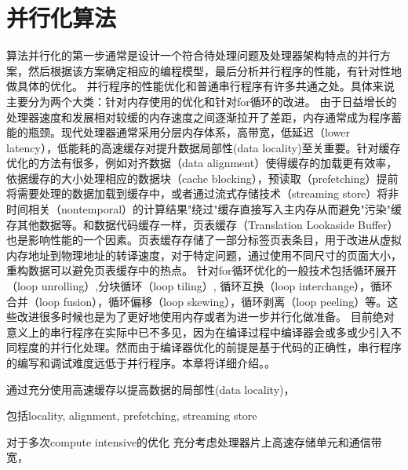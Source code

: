 \chapter{并行化算法}
\label{chp:4}

算法并行化的第一步通常是设计一个符合待处理问题及处理器架构特点的并行方案，然后根据该方案确定相应的编程模型，最后分析并行程序的性能，有针对性地做具体的优化。
并行程序的性能优化和普通串行程序有许多共通之处。具体来说主要分为两个大类：针对内存使用的优化和针对for循环的改进。
由于日益增长的处理器速度和发展相对较缓的内存速度之间逐渐拉开了差距，内存通常成为程序蓄能的瓶颈。现代处理器通常采用分层内存体系，高带宽，低延迟（lower latency），低能耗的高速缓存对提升数据局部性(data locality)至关重要。针对缓存优化的方法有很多，例如对齐数据（data alignment）使得缓存的加载更有效率，依据缓存的大小处理相应的数据块（cache blocking），预读取（prefetching）提前将需要处理的数据加载到缓存中，或者通过流式存储技术（streaming store）将非时间相关（nontemporal）的计算结果"绕过"缓存直接写入主内存从而避免"污染"缓存其他数据等。和数据代码缓存一样，页表缓存（Translation Lookaside Buffer）也是影响性能的一个因素。页表缓存存储了一部分标签页表条目，用于改进从虚拟内存地址到物理地址的转译速度，对于特定问题，通过使用不同尺寸的页面大小，重构数据可以避免页表缓存中的热点。
针对for循环优化的一般技术包括循环展开（loop unrolling）,分块循环（loop tiling）, 循环互换（loop interchange），循环合并（loop fusion），循环偏移（loop skewing），循环剥离（loop peeling）等。这些改进很多时候也是为了更好地使用内存或者为进一步并行化做准备。
目前绝对意义上的串行程序在实际中已不多见，因为在编译过程中编译器会或多或少引入不同程度的并行化处理。然而由于编译器优化的前提是基于代码的正确性，串行程序的编写和调试难度远低于并行程序。本章将详细介绍。。


通过充分使用高速缓存以提高数据的局部性(data locality)，

包括locality, alignment, prefetching, streaming store 

对于多次compute intensive的优化
充分考虑处理器片上高速存储单元和通信带宽，
